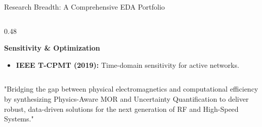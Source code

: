 \begin{frame}[t]{Research Breadth: A Comprehensive EDA Portfolio}
\begin{columns}[t, onlytextwidth]
\begin{column}{0.48\textwidth}
			\vspace{2.5ex}

			\begin{exampleblock}{\small \textbf{Sensitivity \& Optimization}}
				\small
				\begin{itemize}
					\item \textbf{IEEE T-CPMT (2019):} Time-domain sensitivity for active networks.
				\end{itemize}
			\end{exampleblock}
		\end{column}
	\end{columns}

	\vfill
	\begin{mybox}[red]
		\normalsize
		"Bridging the gap between physical electromagnetics and computational efficiency by synthesizing Physics-Aware MOR and Uncertainty Quantification to deliver robust, data-driven solutions for the next generation of RF and High-Speed Systems."
	\end{mybox}

	\vspace{1ex}
\end{frame}

